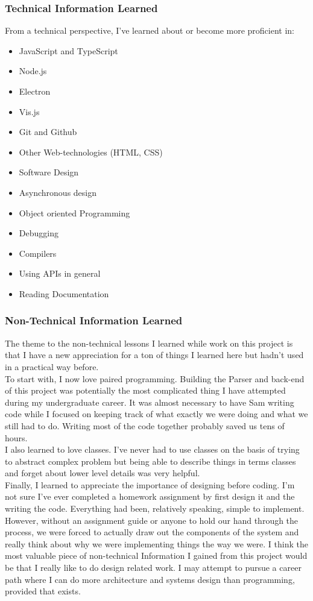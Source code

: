 \documentclass[letterpaper,10pt,titlepage,draftclsnofoot,onecolumn,onesided] {IEEEtran}
\begin{document}
\subsubsection{Technical Information Learned}
From a technical perspective, I've learned about or become more proficient in:
\begin{itemize}
    \item JavaScript and TypeScript
    \item Node.js
    \item Electron
    \item Vis.js
    \item Git and Github
    \item Other Web-technologies (HTML, CSS)
    \item Software Design
    \item Asynchronous design
    \item Object oriented Programming
    \item Debugging
    \item Compilers
    \item Using APIs in general
    \item Reading Documentation
\end{itemize}

\subsubsection{Non-Technical Information Learned}
The theme to the non-technical lessons I learned while work on this project is that I have a new appreciation for a ton of things I learned here but hadn’t used in a practical way before.
\\
To start with, I now love paired programming. 
Building the Parser and back-end of this project was potentially the most complicated thing I have attempted during my undergraduate career. 
It was almost necessary to have Sam writing code while I focused on keeping track of what exactly we were doing and what we still had to do. 
Writing most of the code together probably saved us tens of hours.
\\
I also learned to love classes. 
I've never had to use classes on the basis of trying to abstract complex problem but being able to describe things in terms classes and forget about lower level details was very helpful.
\\
Finally, I learned to appreciate the importance of designing before coding. 
I'm not sure I've ever completed a homework assignment by first design it and the writing the code. 
Everything had been, relatively speaking, simple to implement. 
However, without an assignment guide or anyone to hold our hand through the process, we were forced to actually draw out the components of the system and really think about why we were implementing things the way we were.
I think the most valuable piece of non-technical Information I gained from this project would be that I really like to do design related work. 
I may attempt to pursue a career path where I can do more architecture and systems design than programming, provided that exists. 
\end{document}
